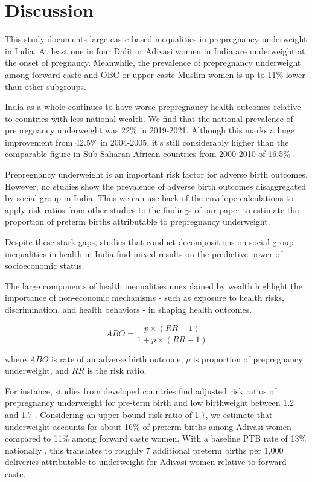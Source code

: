 \section{Discussion}

This study documents large caste based inequalities in prepregnancy underweight in India. At least one in four Dalit or Adivasi women in India are underweight at the onset of pregnancy. Meanwhile, the prevalence of prepregnancy underweight among forward caste and OBC or upper caste Muslim women is up to 11\% lower than other subgroups. 

India as a whole continues to have worse prepregnancy health outcomes relative to countries with less national wealth. We find that the national prevalence of prepregnancy underweight was 22\% in 2019-2021. Although this marks a huge improvement from 42.5\% in 2004-2005, it's still considerably higher than the comparable figure in Sub-Saharan African countries from 2000-2010 of 16.5\% .

Prepregnancy underweight is an important risk factor for adverse birth outcomes. However, no studies show the prevalence of adverse birth outcomes disaggregated by social group in India. Thus we can use back of the envelope calculations to apply risk ratios from other studies to the findings of our paper to estimate the proportion of preterm births attributable to prepregnancy underweight. 

Despite these stark gaps, studies that conduct decompositions on social group inequalities in health in India find mixed results on the predictive power of socioeconomic status. 

The large components of health inequalities unexplained by wealth highlight the importance of non-economic mechanisms - such as exposure to health risks, discrimination, and health behaviors - in shaping health outcomes. 



\begin{equation}
    ABO = \frac{p \times(RR-1)}{1+ p\times(RR-1)}    
\end{equation}

where $ABO$ is rate of an adverse birth outcome, $p$ is proportion of prepregnancy underweight, and $RR$ is the risk ratio. 

For instance, studies from developed countries find adjusted risk ratios of prepregnancy underweight for pre-term birth and low birthweight between 1.2 and 1.7 \cite{girsen2016women} \cite{hur2009512} \cite{wenman2004prospective} \cite{diamond2024impact}.
Considering an upper-bound risk ratio of 1.7, we estimate that underweight accounts for about 16\% of preterm births among Adivasi women compared to 11\% among forward caste women. With a baseline PTB rate of 13\% nationally \cite{jana2023correlates}, this translates to roughly 7 additional preterm births per 1,000 deliveries attributable to underweight for Adivasi women relative to forward caste. 

